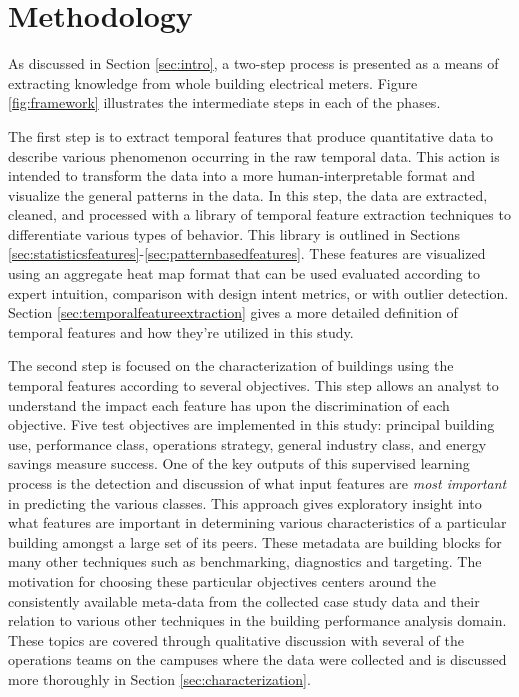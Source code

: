 \chapter{Methodology}
\label{sec:methodology}

As discussed in Section \ref{sec:intro}, a two-step process is presented as a means of extracting knowledge from whole building electrical meters. Figure \ref{fig:framework} illustrates the intermediate steps in each of the phases.

The first step is to extract temporal features that produce quantitative data to describe various phenomenon occurring in the raw temporal data. This action is intended to transform the data into a more human-interpretable format and visualize the general patterns in the data. In this step, the data are extracted, cleaned, and processed with a library of temporal feature extraction techniques to differentiate various types of behavior. This library is outlined in Sections \ref{sec:statisticsfeatures}-\ref{sec:patternbasedfeatures}. These features are visualized using an aggregate heat map format that can be used evaluated according to expert intuition, comparison with design intent metrics, or with outlier detection. Section \ref{sec:temporalfeatureextraction} gives a more detailed definition of temporal features and how they're utilized in this study.

The second step is focused on the characterization of buildings using the temporal features according to several objectives. This step allows an analyst to understand the impact each feature has upon the discrimination of each objective. Five test objectives are implemented in this study: principal building use, performance class, operations strategy, general industry class, and energy savings measure success. One of the key outputs of this supervised learning process is the detection and discussion of what input features are \emph{most important} in predicting the various classes. This approach gives exploratory insight into what features are important in determining various characteristics of a particular building amongst a large set of its peers. These metadata are building blocks for many other techniques such as benchmarking, diagnostics and targeting. The motivation for choosing these particular objectives centers around the consistently available meta-data from the collected case study data and their relation to various other techniques in the building performance analysis domain. These topics are covered through qualitative discussion with several of the operations teams on the campuses where the data were collected and is discussed more thoroughly in Section \ref{sec:characterization}.

